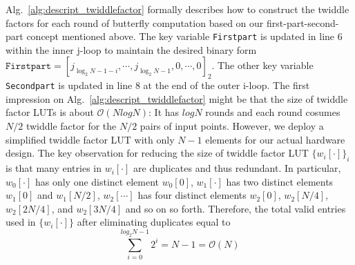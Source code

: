 \documentclass{iacrtrans}
\theoremstyle{plain}
\begin{document}
Alg.~\ref{alg:descript_twiddlefactor} formally describes how to construct the twiddle factors for each round of butterfly computation based on our first-part-second-part concept mentioned above. The key variable \texttt{Firstpart} is updated in line 6 within the inner j-loop to maintain the desired binary form $\texttt{Firstpart}=[j_{\log_2N-1-i},\cdots, j_{\log_2N-1},0,\cdots,0]_2$. The other key variable \texttt{Secondpart} is updated in  line 8 at the end of the outer i-loop.
The first impression on Alg.~\ref{alg:descript_twiddlefactor} might be that the size of twiddle factor LUTs is about $\mathcal{O}(NlogN)$: It has $logN$ rounds and each round cosumes $N/2$ twiddle factor for the $N/2$ pairs of input points.  However, we deploy a simplified twiddle factor LUT with only $N-1$ elements for our actual hardware design. The key observation for reducing the size of twiddle factor LUT $\{w_i[\cdot]\}_i$ is that many entries in $w_i[\cdot]$ are duplicates and thus redundant. In particular, $w_0[\cdot]$ has only one distinct element $w_0[0]$, $w_1[\cdot]$ has two distinct elements $w_1[0]$ and $w_1[N/2]$, $w_2[\cdots]$ has four distinct elements $w_2[0]$, $w_2[N/4]$, $w_2[2N/4]$, and $w_2[3N/4]$ and so on so forth. Therefore, the total valid entries used in $\{w_i[\cdot]\}$ after eliminating duplicates equal to
\[
\sum_{i=0}^{log_2N-1} 2^i = N-1 = \mathcal{O}(N) 
\]
\end{document}
